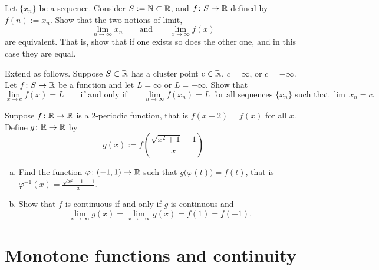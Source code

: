 \begin{exercise}
Let $\{ x_n \}$ be a sequence.  Consider $S := {\mathbb{N}} \subset {\mathbb{R}}$, and
$f \colon S \to {\mathbb{R}}$ defined by $f(n) := x_n$.  Show that
the two notions of limit,
\begin{equation*}
\lim_{n\to\infty} x_n \qquad \text{and} \qquad
\lim_{x\to\infty} f(x) 
\end{equation*}
are equivalent.  That is, show that if one exists so does
the other one, and in this case they are equal.
\end{exercise}

\begin{exercise}
Extend  as follows.
Suppose $S \subset {\mathbb{R}}$ has a cluster point $c \in {\mathbb{R}}$, $c = \infty$,
or $c = -\infty$.  Let $f \colon S \to {\mathbb{R}}$ be a function and let
$L = \infty$ or $L = -\infty$.  Show that
\begin{equation*}
\lim_{x\to c} f(x) = L \qquad \text{if and only if} \qquad
\lim_{n\to\infty} f(x_n) = L ~~\text{for all sequences $\{ x_n \}$ such that $\lim\, x_n =
c$} .
\end{equation*}
\end{exercise}

\begin{exercise}
Suppose $f \colon {\mathbb{R}} \to {\mathbb{R}}$ is a 2-periodic function, that is $f(x +2) =
f(x)$ for all $x$.  Define $g \colon {\mathbb{R}} \to {\mathbb{R}}$ by 
\begin{equation*}
g(x) := f\left(\frac{\sqrt{x^2+1}-1}{x}\right)
\end{equation*}
\begin{enumerate}[a)]
\item
Find the function $\varphi \colon (-1,1) \to {\mathbb{R}}$ such that
$g\bigl(\varphi(t)\bigr) = f(t)$, that is $\varphi^{-1}(x) = 
\frac{\sqrt{x^2+1}-1}{x}$.
\item
Show that $f$ is continuous if and only if $g$ is continuous and
\begin{equation*}
\lim_{x \to \infty} g(x) = 
\lim_{x \to -\infty} g(x) = 
f(1) = f(-1) .
\end{equation*}
\end{enumerate}
\end{exercise}


\sectionnewpage
\section{Monotone functions and continuity}
\label{sec:monotonefunc}

